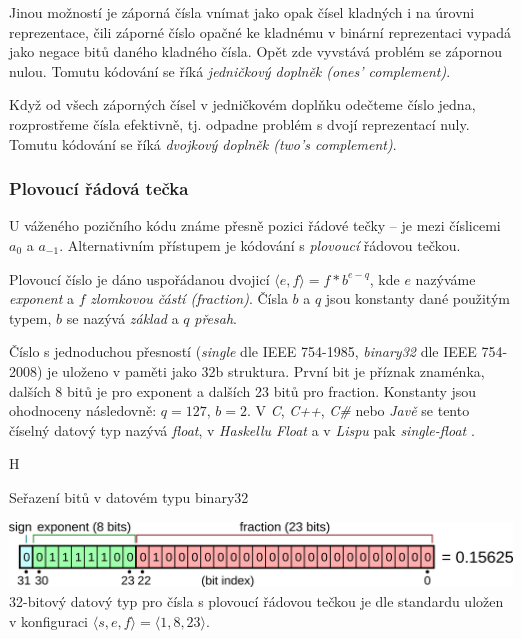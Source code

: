 Jinou možností je záporná čísla vnímat jako opak čísel kladných i na úrovni reprezentace, čili záporné číslo opačné ke kladnému v binární reprezentaci vypadá jako negace bitů daného kladného čísla. Opět zde vyvstává problém se zápornou nulou. Tomutu kódování se říká \textit{jedničkový doplněk (ones' complement)}.

Když od všech záporných čísel v jedničkovém doplňku odečteme číslo jedna, rozprostřeme čísla efektivně, tj. odpadne problém s dvojí reprezentací nuly. Tomutu kódování se říká \textit{dvojkový doplněk (two's complement)}.

\subsubsection{Plovoucí řádová tečka}
U váženého pozičního kódu známe přesně pozici řádové tečky -- je mezi číslicemi $a_0$ a $a_{-1}$. Alternativním přístupem je kódování s \textit{plovoucí} řádovou tečkou.

Plovoucí číslo je dáno uspořádanou dvojicí $\langle e,f\rangle = f * b^{e-q}$, kde $e$ nazýváme \textit{exponent} a $f$ \textit{zlomkovou částí (fraction)}. Čísla $b$ a $q$ jsou konstanty dané použitým typem, $b$ se nazývá \textit{základ} a $q$ \textit{přesah}.

\begin{example}
Číslo s jednoduchou přesností (\textit{single} dle IEEE 754-1985, \textit{binary32} dle IEEE 754-2008) je uloženo v paměti jako 32b struktura. První bit je příznak znaménka, dalších 8 bitů je pro exponent a dalších 23 bitů pro fraction. Konstanty jsou ohodnoceny následovně: $q=127$, $b=2$. V \textit{C}, \textit{C++}, \textit{C\#} nebo \textit{Javě} se tento číselný datový typ nazývá \textit{float}, v \textit{Haskellu Float} a v \textit{Lispu} pak \textit{single-float} \cite{wiki:float}.
\begin{myfigure}{H}
\caption{Seřazení bitů v datovém typu binary32 \cite{wiki:file:binary32}}
\includegraphics[width=\linewidth]{graphics/float.png}\label{obr:binary32}
32-bitový datový typ pro čísla s plovoucí řádovou tečkou je dle standardu uložen v konfiguraci $\langle s,e,f \rangle=\langle 1,8,23\rangle$.
\end{myfigure}
\end{example}

